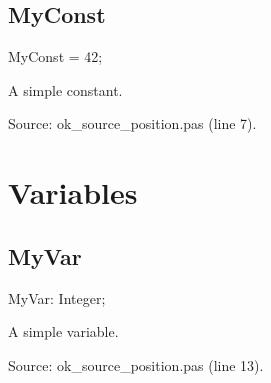\documentclass{report}
\newif\ifpdf
\begin{document}
\subsection*{MyConst}
\fi
\label{ok_source_position-MyConst}
\begin{list}{}{
\setlength{\itemindent}{0cm}
\setlength{\listparindent}{0cm}
\setlength{\leftmargin}{\evensidemargin}
\addtolength{\leftmargin}{\tmplength}
\settowidth{\labelsep}{X}
\addtolength{\leftmargin}{\labelsep}
\setlength{\labelwidth}{\tmplength}
}
\item[\textbf{Declaration}\hfill]
\ifpdf
\begin{flushleft}
\fi
\begin{ttfamily}
MyConst = 42;\end{ttfamily}

\ifpdf
\end{flushleft}
\fi

\par
\item[\textbf{Description}]
A simple constant.\par
Source: ok{\_}source{\_}position.pas (line 7).

\end{list}
\section{Variables}
\ifpdf
\subsection*{\large{\textbf{MyVar}}\normalsize\hspace{1ex}\hrulefill}
\else
\subsection*{MyVar}
\fi
\label{ok_source_position-MyVar}
\begin{list}{}{
\setlength{\itemindent}{0cm}
\setlength{\listparindent}{0cm}
\setlength{\leftmargin}{\evensidemargin}
\addtolength{\leftmargin}{\tmplength}
\settowidth{\labelsep}{X}
\addtolength{\leftmargin}{\labelsep}
\setlength{\labelwidth}{\tmplength}
}
\item[\textbf{Declaration}\hfill]
\ifpdf
\begin{flushleft}
\fi
\begin{ttfamily}
MyVar: Integer;\end{ttfamily}

\ifpdf
\end{flushleft}
\fi

\par
\item[\textbf{Description}]
A simple variable.\par
Source: ok{\_}source{\_}position.pas (line 13).

\end{list}
\end{document}
